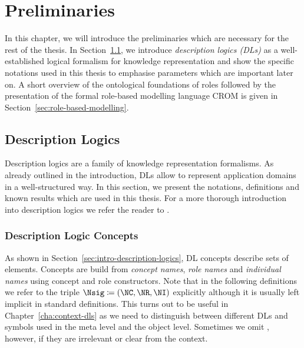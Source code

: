 
\chapter{Preliminaries}
\label{cha:preliminaries}

In this chapter, we will introduce the preliminaries which are necessary for the rest of the thesis.
In Section~\ref{sec:prelim-dls}, we introduce \emph{description logics (DLs)} as a well-established
logical formalism for knowledge representation and show the specific notations used in this thesis
to emphasise parameters which are important later on. A short overview of the ontological
foundations of roles followed by the presentation of the formal role-based modelling language CROM
is given in Section~\ref{sec:role-based-modelling}.

\section{Description Logics}
\label{sec:prelim-dls}

Description logics are a family of knowledge representation formalisms. As already outlined in the
introduction, DLs allow to represent application domains in a well-structured way. In this section,
we present the notations, definitions and known results which are used in this thesis.
%
For a more thorough introduction into description logics we refer the reader to
\cite{DLhandbook-07}.

\subsection{Description Logic Concepts}
\label{sec:dl-concepts}

As shown in Section~\ref{sec:intro-description-logics}, DL concepts describe sets of
elements. Concepts are build from \emph{concept names}, \emph{role names} and \emph{individual
  names} using concept and role constructors.  Note that in the following definitions we refer to
the triple $\Nsig \coloneqq (\NC, \NR, \NI)$ explicitly although it is usually left implicit in
standard definitions.  This turns out to be useful in Chapter~\ref{cha:context-dls} as we need to
distinguish between different DLs and symbols used in the meta level and the object level.
Sometimes we omit \Nsig, however, if they are irrelevant or clear from the context.

